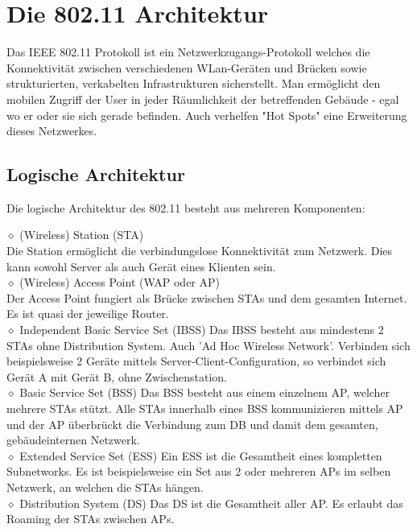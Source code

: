 \documentclass[11pt]{article}
\begin{document}
    \section{Die 802.11 Architektur}
    Das IEEE 802.11 Protokoll ist ein Netzwerkzugangs-Protokoll welches die Konnektivität zwischen verschiedenen
    WLan-Geräten und Brücken sowie strukturierten, verkabelten Infrastrukturen sicherstellt.
    Man ermöglicht den mobilen Zugriff der User in jeder Räumlichkeit der betreffenden Gebäude - egal wo er oder sie
    sich gerade befinden. Auch verhelfen "Hot Spots" eine Erweiterung dieses Netzwerkes.

    \subsection{Logische Architektur}
    Die logische Architektur des 802.11 besteht aus mehreren Komponenten:\\
    \begin{addmargin}[1em]{1em}
        $\diamond$ (Wireless) Station (STA)\\
        Die Station ermöglicht die verbindungslose Konnektivität zum Netzwerk. Dies kann sowohl Server
        als auch Gerät eines Klienten sein.\\
        $\diamond$ (Wireless) Access Point (WAP oder AP)\\
        Der Access Point fungiert als Brücke zwischen STAs und dem gesamten Internet. Es ist quasi der jeweilige Router.\\
        $\diamond$ Independent Basic Service Set (IBSS)
        Das IBSS besteht aus mindestens 2 STAs ohne Distribution System. Auch 'Ad Hoc Wireless Network'. Verbinden sich
        beispielsweise 2 Geräte mittels Server-Client-Configuration, so verbindet sich Gerät A mit Gerät B,
        ohne Zwischenstation.\\
        $\diamond$ Basic Service Set (BSS)
        Das BSS besteht aus einem einzelnem AP, welcher mehrere STAs stützt.
        Alle STAs innerhalb eines BSS kommunizieren mittels AP und der AP überbrückt die Verbindung zum DB und damit dem
        gesamten, gebäudeinternen Netzwerk.\\
        $\diamond$ Extended Service Set (ESS)
        Ein ESS ist die Gesamtheit eines kompletten Subnetworks.
        Es ist beispielsweise ein Set aus 2 oder mehreren APs im selben Netzwerk, an welchen die STAs hängen.\\
        $\diamond$ Distribution System (DS)
        Das DS ist die Gesamtheit aller AP.
        Es erlaubt das Roaming der STAs zwischen APs.\\
    \end{addmargin}
\end{document}
